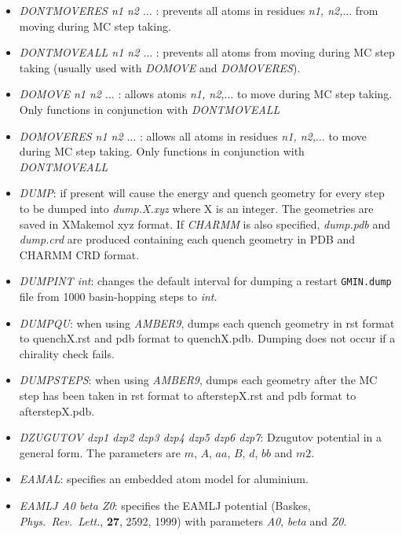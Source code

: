 \documentclass[12pt,a4paper,dvips]{article}
\begin{document}
\begin{itemize}
\item {\it DONTMOVERES n1 n2 $\ldots$ \/}: prevents all atoms in residues {\it n1, n2,$\ldots$} from moving during MC step taking.

\item {\it DONTMOVEALL n1 n2 $\ldots$ \/}: prevents all atoms from moving during MC step taking (usually used with {\it DOMOVE} and {\it DOMOVERES}). 

\item {\it DOMOVE n1 n2 $\ldots$ \/}: allows atoms {\it n1, n2,$\ldots$} to move during MC step taking. Only functions in conjunction with 
{\it DONTMOVEALL\/}

\item {\it DOMOVERES n1 n2 $\ldots$ \/}: allows all atoms in residues {\it n1, n2,$\ldots$} to move during MC step taking. Only functions in conjunction 
with {\it DONTMOVEALL\/}

\item {\it DUMP\/}: if present will cause the energy and quench geometry for every step
to be dumped into {\it dump.X.xyz\/} where X is an integer. The geometries are saved 
in XMakemol xyz format. If {\it CHARMM\/} is also specified, {\it dump.pdb\/} and {\it dump.crd\/}
are produced containing each quench geometry in PDB and CHARMM CRD format.

\item {\it DUMPINT int\/}: changes the default interval for dumping a restart 
{\tt GMIN.dump} file from 1000 basin-hopping steps to {\it int\/}.

\item {\it DUMPQU\/}: when using {\it AMBER9\/}, dumps each quench geometry in rst format to quenchX.rst 
and pdb format to quenchX.pdb. Dumping does not occur if a chirality check fails.

\item {\it DUMPSTEPS\/}: when using {\it AMBER9\/}, dumps each geometry after the MC step has been taken in rst format to afterstepX.rst 
and pdb format to afterstepX.pdb. 

\item {\it DZUGUTOV dzp1 dzp2 dzp3 dzp4 dzp5 dzp6 dzp7\/}: Dzugutov potential in a general form.
The parameters are $m$, $A$, $aa$, $B$, $d$, $bb$ and $m2$.

\item {\it EAMAL}: specifies an embedded atom model for aluminium.

\item {\it EAMLJ A0 beta Z0\/}: specifies the EAMLJ potential (Baskes, {\it Phys.~Rev.~Lett.\/},
{\bf 27}, 2592, 1999) with parameters {\it A0\/}, {\it beta\/} and {\it Z0\/}.


\end{itemize}
\end{document}
